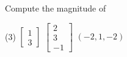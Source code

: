 \documentclass{ximera}
\begin{document}
\begin{exercise}%
    Compute the magnitude of
    \begin{tasks}(3)
        \task
        $\begin{bmatrix}
            1 \\
            3
        \end{bmatrix}$
        \task
        $\begin{bmatrix}
            2 \\
            3 \\
            -1
        \end{bmatrix}$
        \task $(-2,1,-2)$
    \end{tasks}
\end{exercise}
\end{document}
